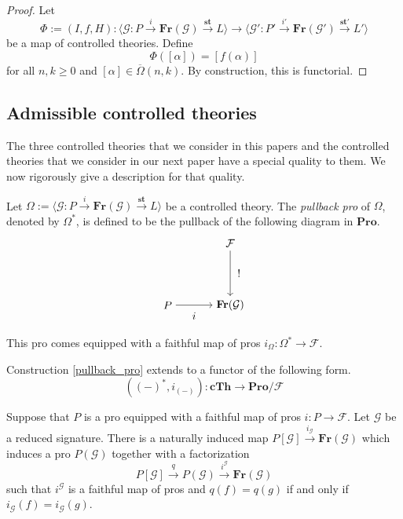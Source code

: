 \documentclass{tac}
\begin{document}
 \begin{proof}
Let 
\[
	\Phi:=(I,f,H):\langle \mathcal{G}:P\xrightarrow{i}\mathbf{Fr}(\mathcal{G})\xrightarrow{\mathbf{st}}L\rangle\to \langle \mathcal{G}':P'\xrightarrow{i'}\mathbf{Fr}(\mathcal{G}')\xrightarrow{\mathbf{st}'}L'\rangle
    \] 
be a map of controlled theories. Define
\[
\Phi([\alpha])=[f(\alpha)]
\]
for all $n,k\geq 0$ and $[\alpha]\in \overline{\Omega}(n,k)$. By construction, this is functorial.
 \end{proof}

\subsection*{Admissible controlled theories}
The three controlled theories that we consider in this papers and the controlled theories that we consider in our next paper have a special quality to them. We now rigorously give a description for that quality.
\begin{construction}\label{pullback_pro}
Let $\Omega:=\langle \mathcal{G}:P\xrightarrow{i}\mathbf{Fr}(\mathcal{G})\xrightarrow{\mathbf{st}}L\rangle$ be a controlled theory. The \emph{pullback pro} of $\Omega$, denoted by $\Omega^*$, is defined to be the pullback of the following diagram in $\mathbf{Pro}$.
\[
  \begin{tikzpicture}[node distance=2cm, auto]
        \node (A) {};
       \node (B)[right of=A]{$\mathcal{F}$};
       \node (C)[below of=A]{$P$};
       \node(D)[right of=C]{$\mathbf{Fr}(\mathcal{G})$};
       \draw[->](B) to node[right=3]{$!$} (D);
       \draw[->](C) to node[below=3]{$i$} (D);
    \end{tikzpicture}
\]
This pro comes equipped with a faithful map of pros $i_\Omega:\Omega^*\to \mathcal{F}$.
\end{construction}

\begin{lemma}
Construction \ref{pullback_pro} extends to a functor of the following form.
\[
((-)^*,i_{(-)}):\mathbf{cTh}\to\mathbf{Pro}/\mathcal{F}
\]
\end{lemma}

    Suppose that $P$ is a pro equipped with a faithful map of pros $i:P\to\mathcal{F}$. Let $\mathcal{G}$ be a reduced signature. There is a naturally induced map $P[\mathcal{G}]\xrightarrow{i_\mathcal{G}}\mathbf{Fr}(\mathcal{G})$ which induces a pro $P(\mathcal{G})$ together with a factorization 
    \[
    P[\mathcal{G}]\xrightarrow{q}P(\mathcal{G})\xrightarrow{i^\mathcal{G}}\mathbf{Fr}(\mathcal{G})
    \]
    such that $i^\mathcal{G}$ is a faithful map of pros and $q(f)=q(g)$ if and only if $i_\mathcal{G}(f)=i_\mathcal{G}(g)$. 
\end{document}

